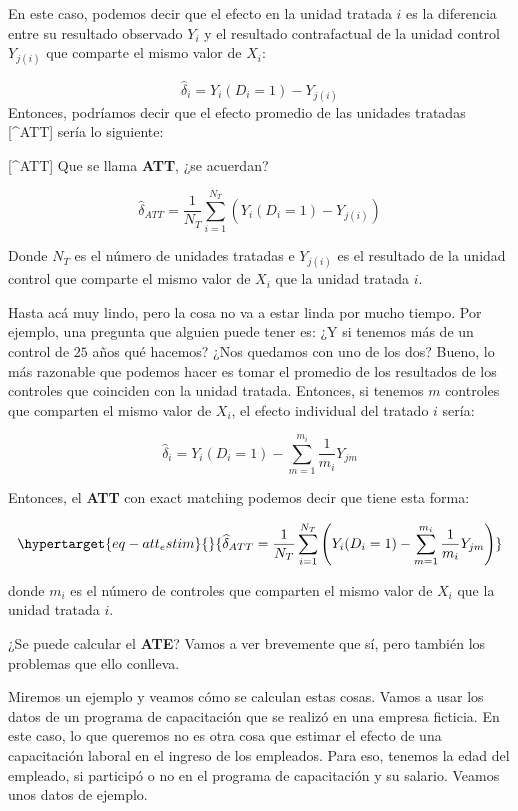 \documentclass[
  letterpaper,
  DIV=11,
  numbers=noendperiod,
  oneside]{scrreprt}
\begin{document}
En este caso, podemos decir que el efecto en la unidad tratada \(i\) es
la diferencia entre su resultado observado \(Y_i\) y el resultado
contrafactual de la unidad control \(Y_{j(i)}\) que comparte el mismo
valor de \(X_i\):

\[
\widehat{\delta}_i = Y_i(D_i=1) - Y_{j(i)}
\] Entonces, podríamos decir que el efecto promedio de las unidades
tratadas {[}\^{}ATT{]} sería lo siguiente:

{[}\^{}ATT{]} Que se llama \textbf{ATT}, ¿se acuerdan?

\[
\widehat{\delta}_{ATT} = \dfrac{1}{N_T} \sum_{i=1}^{N_T}(Y_i(D_i=1) - Y_{j(i)})
\]

Donde \(N_T\) es el número de unidades tratadas e \(Y_{j(i)}\) es el
resultado de la unidad control que comparte el mismo valor de \(X_i\)
que la unidad tratada \(i\).

Hasta acá muy lindo, pero la cosa no va a estar linda por mucho tiempo.
Por ejemplo, una pregunta que alguien puede tener es: ¿Y si tenemos más
de un control de \(25\) años qué hacemos? ¿Nos quedamos con uno de los
dos? Bueno, lo más razonable que podemos hacer es tomar el promedio de
los resultados de los controles que coinciden con la unidad tratada.
Entonces, si tenemos \(m\) controles que comparten el mismo valor de
\(X_i\), el efecto individual del tratado \(i\) sería:

\[
\widehat{\delta}_i = Y_i(D_i=1) - \sum_{m=1}^{m_i} \dfrac{1}{m_i} Y_{jm}
\]

Entonces, el \textbf{ATT} con exact matching podemos decir que tiene
esta forma:

\begin{equation}\protect\hypertarget{eq-att_estim}{}{
\widehat{\delta}_{ATT} = \dfrac{1}{N_T} \sum_{i=1}^{N_T} \left( Y_i(D_i=1) - \sum_{m=1}^{m_i} \dfrac{1}{m_i} Y_{jm} \right)
}\label{eq-att_estim}\end{equation}

donde \(m_i\) es el número de controles que comparten el mismo valor de
\(X_i\) que la unidad tratada \(i\).

¿Se puede calcular el \textbf{ATE}? Vamos a ver brevemente que sí, pero
también los problemas que ello conlleva.

Miremos un ejemplo y veamos cómo se calculan estas cosas. Vamos a usar
los datos de un programa de capacitación que se realizó en una empresa
ficticia. En este caso, lo que queremos no es otra cosa que estimar el
efecto de una capacitación laboral en el ingreso de los empleados. Para
eso, tenemos la edad del empleado, si participó o no en el programa de
capacitación y su salario. Veamos unos datos de ejemplo.
\end{document}
